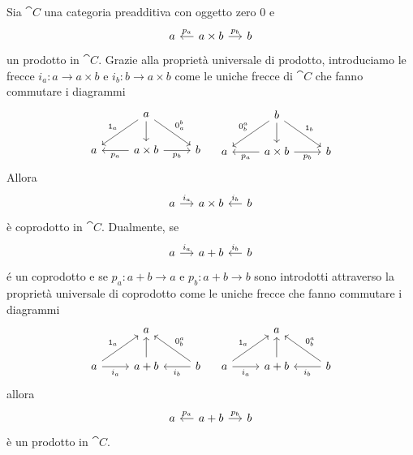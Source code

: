 \begin{proposition}\label{proposition:BinProdsAreBinCoprods}
  Sia \(\cat C\) una categoria preadditiva con oggetto zero \(0\) e
  \[
    \begin{tikzcd}[column sep=small]
      a & a \times b \ar["{p_a}", l, swap] \ar["{p_b}", r] & b
    \end{tikzcd}
  \]
  un prodotto in \(\cat C\). Grazie alla proprietà universale di
  prodotto, introduciamo le frecce \(i_a : a \to a \times b\) e
  \(i_b : b \to a \times b\) come le uniche frecce di \(\cat C\) che fanno
  commutare i diagrammi
  \[
    \begin{tikzcd}
      & a \ar["{\id_a}", dl, swap] \ar[d] \ar["{0_a^b}", dr] \\
      a & a \times b \ar["{p_a}", l] \ar["{p_b}", r, swap] & b
    \end{tikzcd}
    \quad
    \begin{tikzcd}
      & b \ar["{0_b^a}", dl, swap] \ar[d] \ar["{\id_b}", dr] \\
      a & a \times b \ar["{p_a}", l] \ar["{p_b}", r, swap] & b
    \end{tikzcd}
  \]
  Allora
  \[
    \begin{tikzcd}[column sep=small]
      a \ar["{i_a}", r] & a \times b & b \ar["{i_b}", l, swap]
    \end{tikzcd}
  \]
  è coprodotto in \(\cat C\). Dualmente, se
  \[
    \begin{tikzcd}[column sep=small]
      a \ar["{i_a}", r] & a + b & b \ar["{i_b}", l, swap]
    \end{tikzcd}
  \]
  é un coprodotto e se \(p_a : a+b \to a\) e \(p_b : a+b \to b\) sono
  introdotti attraverso la proprietà universale di coprodotto come le
  uniche frecce che fanno commutare i diagrammi
  \[
    \begin{tikzcd}
      & a \\
      a \ar["{i_a}", r, swap] \ar["{\id_a}", ur] & a + b \ar[u] & b
      \ar["{i_b}", l] \ar["{0_b^a}", ul, swap]
    \end{tikzcd}
    \quad
    \begin{tikzcd}
      & a \\
      a \ar["{i_a}", r, swap] \ar["{\id_a}", ur] & a + b \ar[u] & b
      \ar["{i_b}", l] \ar["{0_b^a}", ul, swap]
    \end{tikzcd}
  \]
  allora
  \[
    \begin{tikzcd}[column sep=small]
      a & a + b \ar["{p_a}", l, swap] \ar["{p_b}", r] & b
    \end{tikzcd}
  \]
  è un prodotto in \(\cat C\).
\end{proposition}

